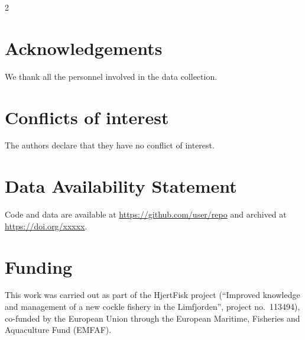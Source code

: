 \begin{spacing}{2}
\section*{Acknowledgements}
We thank all the personnel involved in the data collection.




\section*{Conflicts of interest}
The authors declare that they have no conflict of interest.

\section*{Data Availability Statement}
Code and data are available at \url{https://github.com/user/repo} and archived
at \url{https://doi.org/xxxxx}.

\section*{Funding}
This work was carried out as part of the HjertFisk project (``Improved knowledge and management of a new cockle fishery in the Limfjorden'', project no.\ 113494), co-funded by the European Union through the European Maritime, Fisheries and Aquaculture Fund (EMFAF).



\end{spacing}

